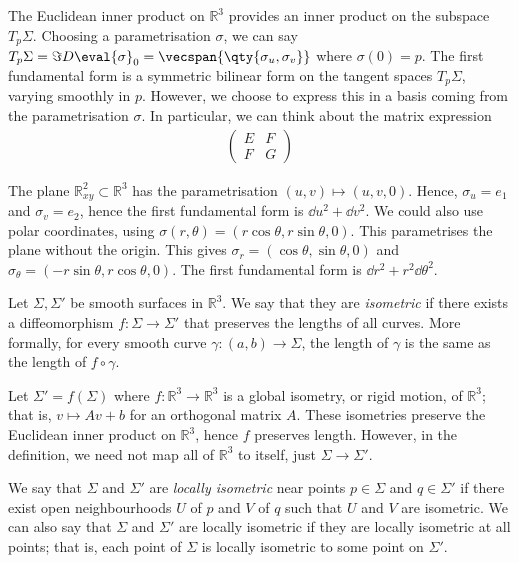 \begin{remark}
	The Euclidean inner product on $\mathbb R^3$ provides an inner product on the subspace $T_p \Sigma$.
	Choosing a parametrisation $\sigma$, we can say $T_p \Sigma = \Im D \eval{\sigma}_0 = \vecspan{\qty{\sigma_u, \sigma_v}}$ where $\sigma(0) = p$.
	The first fundamental form is a symmetric bilinear form on the tangent spaces $T_p \Sigma$, varying smoothly in $p$.
	However, we choose to express this in a basis coming from the parametrisation $\sigma$.
	In particular, we can think about the matrix expression
	\begin{align*}
		\begin{pmatrix}
			E & F \\
			F & G
		\end{pmatrix}
	\end{align*}
\end{remark}
\begin{example}
	The plane $\mathbb R^2_{xy} \subset \mathbb R^3$ has the parametrisation $(u,v) \mapsto (u,v,0)$.
	Hence, $\sigma_u = e_1$ and $\sigma_v = e_2$, hence the first fundamental form is $\dd{u}^2 + \dd{v}^2$.
	We could also use polar coordinates, using $\sigma(r,\theta) = (r\cos\theta,r\sin\theta,0)$.
	This parametrises the plane without the origin.
	This gives $\sigma_r = (\cos\theta,\sin\theta,0)$ and $\sigma_\theta = (-r\sin\theta, r\cos\theta,0)$.
	The first fundamental form is $\dd{r}^2 + r^2 \dd{\theta}^2$.
\end{example}
\begin{definition}
	Let $\Sigma, \Sigma'$ be smooth surfaces in $\mathbb R^3$.
	We say that they are \textit{isometric} if there exists a diffeomorphism $f\colon \Sigma \to \Sigma'$ that preserves the lengths of all curves.
	More formally, for every smooth curve $\gamma \colon (a,b) \to \Sigma$, the length of $\gamma$ is the same as the length of $f \circ \gamma$.
\end{definition}
\begin{example}
	Let $\Sigma' = f(\Sigma)$ where $f \colon \mathbb R^3 \to \mathbb R^3$ is a global isometry, or rigid motion, of $\mathbb R^3$; that is, $v \mapsto Av+b$ for an orthogonal matrix $A$.
	These isometries preserve the Euclidean inner product on $\mathbb R^3$, hence $f$ preserves length.
	However, in the definition, we need not map all of $\mathbb R^3$ to itself, just $\Sigma \to \Sigma'$.
\end{example}
\begin{definition}
	We say that $\Sigma$ and $\Sigma'$ are \textit{locally isometric} near points $p \in \Sigma$ and $q \in \Sigma'$ if there exist open neighbourhoods $U$ of $p$ and $V$ of $q$ such that $U$ and $V$ are isometric.
	We can also say that $\Sigma$ and $\Sigma'$ are locally isometric if they are locally isometric at all points; that is, each point of $\Sigma$ is locally isometric to some point on $\Sigma'$.
\end{definition}
